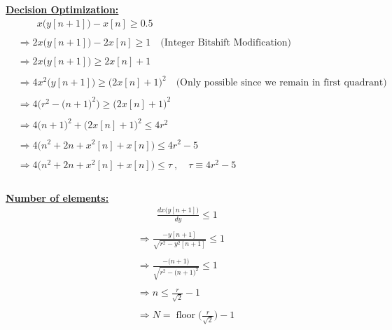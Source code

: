 \documentclass{article}
\DeclareMathOperator{\floor}{floor}
\begin{document}
\underline{\textbf{Decision Optimization:}}
\begin{align*}
    &\quad \quad x\Big(y[n + 1]\Big) - x[n] \geq 0.5 \\ \\
    &\Rightarrow 2x\Big(y[n + 1]\Big) - 2x[n] \geq 1 \quad \big(\text{Integer Bitshift Modification}\big) \\ \\
    &\Rightarrow 2x\Big(y[n + 1]\Big) \geq 2x[n] + 1 \\ \\
    &\Rightarrow 4x^{2}\Big(y[n + 1]\Big) \geq \Big(2x[n] + 1\Big)^{2} \quad \big(\text{Only possible since we remain in first quadrant}\big) \\ \\
    &\Rightarrow 4\Big(r^{2} - \big(n + 1\big)^{2}\Big) \geq \Big(2x[n] + 1\Big)^{2} \\ \\
    &\Rightarrow 4\Big(n + 1\Big)^{2} + \Big(2x[n] + 1\Big)^{2} \leq 4r^{2} \\ \\
    &\Rightarrow 4\Big(n^{2} + 2n + x^{2}[n] + x[n]\Big) \leq 4r^{2} - 5 \\ \\
    &\Rightarrow 4\Big(n^{2} + 2n + x^{2}[n] + x[n]\Big) \leq \tau \ , \quad \tau \equiv 4r^{2} - 5 \\ \\
\end{align*}

\underline{\textbf{Number of elements:}}
\begin{align*}
    &\quad \quad \frac{dx\Big(y[n + 1]\Big)}{dy} \leq 1 \\ \\
    &\Rightarrow \frac{-y[n + 1]}{\sqrt{r^{2} - y^{2}[n + 1]}} \leq 1 \\ \\
    &\Rightarrow \frac{-\big(n + 1\big)}{\sqrt{r^{2} - \big(n + 1\big)^{2}}} \leq 1 \\ \\
    &\Rightarrow n \leq \frac{r}{\sqrt{2}} - 1 \\ \\
    &\Rightarrow N = \floor\Bigg(\frac{r}{\sqrt{2}}\Bigg) - 1 \\ \\
\end{align*}
\end{document}
